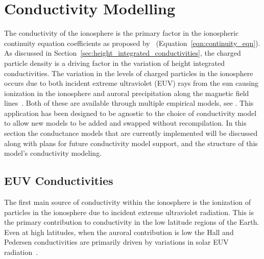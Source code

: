 \chapter{Conductivity Modelling}
\label{chap:conductivity}
The conductivity of the ionosphere is the primary factor in the ionospheric continuity equation coefficients as proposed by~\citet{goodman1995} (Equation~\ref{eqn:continuity_eqn}). As discussed in Section~\ref{sec:height_integrated_conductivities}, the charged particle density is a driving factor in the variation of height integrated conductivities. The variation in the levels of charged particles in the ionosphere occurs due to both incident extreme ultraviolet (EUV) rays from the sun causing ionization in the ionosphere and auroral precipitation along the magnetic field lines~\citep{cousins2015}. Both of these are available through multiple empirical models, see \citet{moen1993,cousins2015, hardy1987}. This application has been designed to be agnostic to the choice of conductivity model to allow new models to be added and swapped without recompilation. In this section the conductance models that are currently implemented will be discussed along with plans for future conductivity model support, and the structure of this model's conductivity modeling.
\section{EUV Conductivities}
\label{sec:euv_conductivity}
The first main source of conductivity within the ionosphere is the ionization of particles in the ionosphere due to incident extreme ultraviolet radiation. This is the primary contribution to conductivity in the low latitude regions of the Earth. Even at high latitudes, when the auroral contribution is low the Hall and Pedersen conductivities are primarily driven by variations in solar EUV radiation~\citep{moen1993}.
